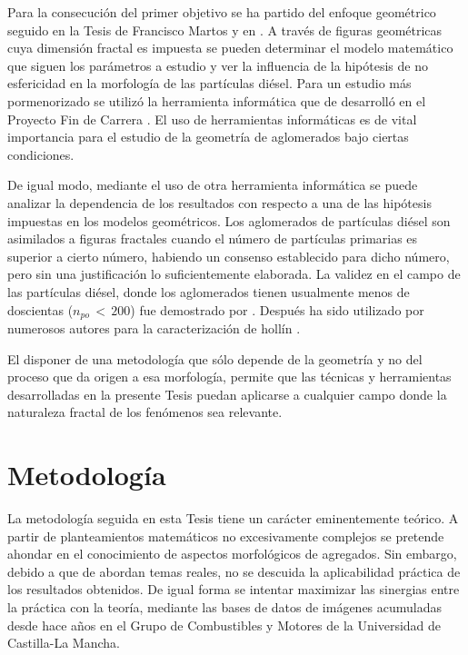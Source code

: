 \par Para la consecución del primer objetivo se ha partido del enfoque geométrico seguido en la Tesis de Francisco Martos \cite{martosphD:2006} y en \cite{lapuertaetal:2006,lapuertaetal:2010}. A través de figuras geométricas cuya dimensión fractal es impuesta se pueden determinar el modelo matemático que siguen los parámetros a estudio y ver la influencia de la hipótesis de no esfericidad en la morfología de las partículas diésel. Para un estudio más pormenorizado se utilizó la herramienta informática que de desarrolló en el Proyecto Fin de Carrera \cite{vieraPFC:2014}. El uso de herramientas informáticas es de vital importancia para el estudio de la geometría de aglomerados bajo ciertas condiciones.

\par De igual modo, mediante el uso de otra herramienta informática \cite{delblancoPFC:2015} se puede analizar la dependencia de los resultados con respecto a una de las hipótesis impuestas en los modelos geométricos. Los aglomerados de partículas diésel son asimilados a figuras fractales cuando el número de partículas primarias es superior a cierto número, habiendo un consenso establecido para dicho número, pero sin una justificación lo suficientemente elaborada. La validez en el campo de las partículas diésel, donde los aglomerados tienen usualmente menos de doscientas ($n_{po}\,<\,200$) fue demostrado por \cite{megaridisetal:1990}. Después ha sido utilizado por numerosos autores para la caracterización de hollín \cite{zhuetal:2003,leeetal:2002,caietal:1995,gorbunovetal:1999,zuritaetal:2002,parketal:2004}.

\par El disponer de una metodología que sólo depende de la geometría y no del proceso que da origen a esa morfología, permite que las técnicas y herramientas desarrolladas en la presente Tesis puedan aplicarse a cualquier campo donde la naturaleza fractal de los fenómenos sea relevante.

\section{Metodología}\label{sec:Metodologia}

\par La metodología seguida en esta Tesis tiene un carácter eminentemente teórico. A partir de planteamientos matemáticos no excesivamente complejos se pretende ahondar en el conocimiento de aspectos morfológicos de agregados. Sin embargo, debido a que de abordan temas reales, no se descuida la aplicabilidad práctica de los resultados obtenidos. De igual forma se intentar maximizar las sinergias entre la práctica con la teoría, mediante las bases de datos de imágenes acumuladas desde hace años en el Grupo de Combustibles y Motores de la Universidad de Castilla-La Mancha.

